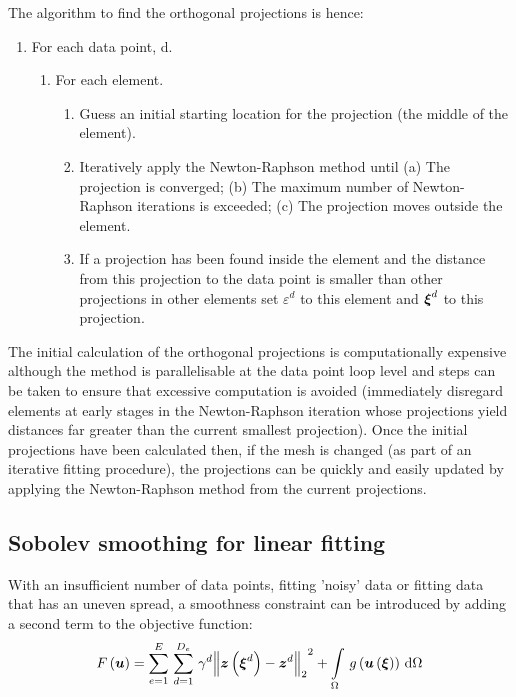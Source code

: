 The algorithm to find the orthogonal projections is hence:
\begin{enumerate}
\item For each data point, d.
  \begin{enumerate}
  \item For each element.
    \begin{enumerate}
    \item Guess an initial starting location for the projection (\eg the
      middle of the element).
    \item Iteratively apply the Newton-Raphson method until (a) The projection
      is converged; (b) The maximum number of Newton-Raphson iterations is
      exceeded; (c) The projection moves outside the element.
    \item If a projection has been found inside the element and the distance
      from this projection to the data point is smaller than other projections
      in other elements set $\varepsilon^{d}$ to this element and
      $\vect{\xi}^{d}$ to this projection.
    \end{enumerate}
  \end{enumerate}
\end{enumerate}

The initial calculation of the orthogonal projections is computationally
expensive although the method is parallelisable at the data point loop level
and steps can be taken to ensure that excessive
computation is avoided (\eg immediately disregard elements at early stages in
the Newton-Raphson iteration whose projections yield distances far greater
than the current smallest projection). Once the initial projections have been
calculated then, if the mesh is changed (as part of an iterative fitting
procedure), the projections can be quickly and easily updated by applying the
Newton-Raphson method from the current projections.

\subsection{Sobolev smoothing for linear fitting}
\label{sec:sobolevlinearfitting}

With an insufficient number of data points, fitting 'noisy' data or fitting
data that has an uneven spread, a smoothness constraint \citep{young:1989}
can be introduced by adding a second term to the objective function:
\begin{equation}
  \fnof{F}{\vectr{u}}=\gsum{e=1}{E}{\gsum{d=1}{D_{e}}{\gamma^{d}
    \norm{\fnof{\vectr{z}}{\vectr{\xi}^{d}}-\vectr{z}^{d}}^{2}}}+
  \gint{\Omega}{}{\fnof{g}{\fnof{\vectr{u}}{\vectr{\xi}}}}{\Omega}
  \label{eqn:soboleverrorfn}
\end{equation}

